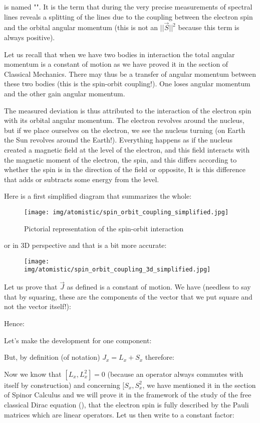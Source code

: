 	is named "". It is the term that during the very precise measurements of spectral lines reveals a splitting of the lines due to the coupling between the electron spin and the orbital angular momentum (this is not an $||\vec{S}||^2$ because this term is always positive).
	\begin{tcolorbox}[title=Remark,colframe=black,arc=10pt]
	Let us recall that when we have two bodies in interaction the total angular momentum is a constant of motion as we have proved it in the section of Classical Mechanics. There may thus be a transfer of angular momentum between these two bodies (this is the spin-orbit coupling!). One loses angular momentum and the other gain angular momentum.
	\end{tcolorbox}
	The measured deviation is thus attributed to the interaction of the electron spin with its orbital angular momentum. The electron revolves around the nucleus, but if we place ourselves on the electron, we see the nucleus turning (on Earth the Sun revolves around the Earth!). Everything happens as if the nucleus created a magnetic field at the level of the electron, and this field interacts with the magnetic moment of the electron, the spin, and this differs according to whether the spin is in the direction of the field or opposite, It is this difference that adds or subtracts some energy from the level.
	
	Here is a first simplified diagram that summarizes the whole:
	\begin{figure}[H]
		\centering
		\texttt{[image: img/atomistic/spin\_orbit\_coupling\_simplified.jpg]}	
		\caption{Pictorial representation of the spin-orbit interaction}
	\end{figure}
	or in $3$D perspective and that is a bit more accurate:
	\begin{figure}[H]
		\centering
		\texttt{[image: img/atomistic/spin\_orbit\_coupling\_3d\_simplified.jpg]}
	\end{figure}
	Let us prove that $\vec{J}$ as defined is a constant of motion. We have (needless to say that by squaring, these are the components of the vector that we put square and not the vector itself!):
	
	Hence:
	
	Let's make the development for one  component:
	
	But, by definition (of notation) $J_x=L_x+S_x$ therefore:
	
	Now we know that $[L_x,L_x^2]=0$ (because an operator always commutes with itself by construction) and concerning $[S_x,S_x^2$, we have mentioned it in the section of Spinor Calculus and we will prove it in the framework of the study of the free classical Dirac equation (), that the electron spin is fully described by the Pauli matrices which are linear operators. Let us then write to a constant factor:
	
